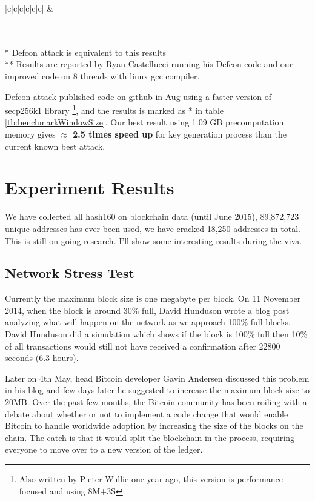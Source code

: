 \begin{table}[h!]
\begin{tabular}{|c|c|c|c|c|c|}
		 &                                   \\ \hline
	\end{tabular}
	\\ \mbox{} \\ * Defcon attack \cite{RyanDefcon} is equivalent to this results 
	\\ ** Results are reported by Ryan Castellucci running his Defcon code and our improved code on 8 threads with linux gcc compiler.
\end{table}

Defcon attack \cite{RyanDefcon} published code on github in Aug using a faster version of secp256k1 library \footnote{Also written by Pieter Wullie one year ago, this version is performance focused and using 8M+3S}, and the results is marked as * in table \ref{tb:benchmarkWindowSize}.  Our best result using 1.09 GB precomputation memory gives  \textbf{$\approx$ 2.5 times speed up} for key generation process than the current known best attack.

\section{Experiment Results}
We have collected all hash160 on blockchain data (until June 2015), 89,872,723 unique addresses has ever been used, we have cracked 18,250 addresses in total. This is still on going research. I'll show some interesting results during the viva.
\subsection{Network Stress Test}
Currently the maximum block size is one megabyte per block. On 11 November 2014, when the block is around 30\% full, David Hunduson wrote a blog post analyzing what will happen on the network as we approach 100\% full blocks. David Hunduson did a simulation which shows if the block is 100\% full then 10\% of all transactions would still not have received a confirmation after 22800 seconds (6.3 hours).

Later on 4th May, head Bitcoin developer Gavin Andersen discussed this problem in his blog and few days later he suggested to increase the maximum block size to 20MB. Over the past few months, the Bitcoin community has been roiling with a debate about whether or not to implement a code change that would enable Bitcoin to handle worldwide adoption by increasing the size of the blocks on the chain. The catch is that it would split the blockchain in the process, requiring everyone to move over to a new version of the ledger.

